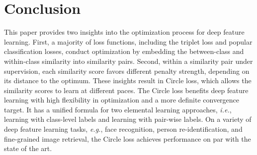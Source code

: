 \documentclass[10pt,twocolumn,letterpaper]{article}
\begin{document}
\section{Conclusion}
This paper provides two insights into the optimization process for deep feature learning. First, a majority of loss functions, including the triplet loss and popular classification losses, conduct optimization by embedding the between-class and within-class similarity into similarity pairs. Second, within a similarity pair under supervision, each similarity score favors different penalty strength, depending on its distance to the optimum. These insights result in Circle loss, which allows the similarity scores to learn at different paces. The Circle loss benefits deep feature learning with high flexibility in optimization and a more definite convergence target. It has a unified formula for two elemental learning approaches, \emph{i.e.}, learning with class-level labels and learning with pair-wise labels. On a variety of deep feature learning tasks, \emph{e.g.}, face recognition, person re-identification, and fine-grained image retrieval, the Circle loss achieves performance on par with the state of the art. 



{\small


}


 


\vspace{0.5em}
\end{document}
